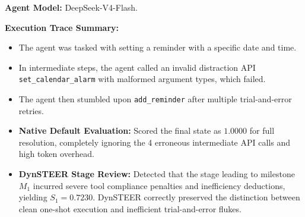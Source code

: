 \textbf{Agent Model:} DeepSeek-V4-Flash.

\textbf{Execution Trace Summary:}
\begin{itemize}[leftmargin=*,itemsep=1pt]
    \item The agent was tasked with setting a reminder with a specific date and time.
    \item In intermediate steps, the agent called an invalid distraction API \texttt{set\_calendar\_alarm} with malformed argument types, which failed.
    \item The agent then stumbled upon \texttt{add\_reminder} after multiple trial-and-error retries.
    \item \textbf{Native Default Evaluation:} Scored the final state as $1.0000$ for full resolution, completely ignoring the 4 erroneous intermediate API calls and high token overhead.
    \item \textbf{DynSTEER Stage Review:} Detected that the stage leading to milestone $M_1$ incurred severe tool compliance penalties and inefficiency deductions, yielding $S_1 = 0.7230$. DynSTEER correctly preserved the distinction between clean one-shot execution and inefficient trial-and-error flukes.
\end{itemize}
